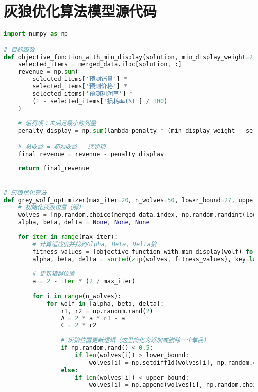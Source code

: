 \documentclass[withoutpreface,bwprint]{cumcmthesis} %
\begin{document}
\section{灰狼优化算法模型源代码}
\begin{lstlisting}[language=python]
import numpy as np

# 目标函数
def objective_function_with_min_display(solution, min_display_weight=2.5, lambda_penalty=300):
    selected_items = merged_data.iloc[solution, :]
    revenue = np.sum(
        selected_items['预测销量'] * 
        selected_items['预测价格'] * 
        selected_items['预测利润率'] * 
        (1 - selected_items['损耗率(%)'] / 100)
    )
    
    # 惩罚项：未满足最小陈列量
    penalty_display = np.sum(lambda_penalty * (min_display_weight - selected_items['预测销量'])**2 * (selected_items['预测销量'] < min_display_weight))

    # 总收益 = 初始收益 - 惩罚项
    final_revenue = revenue - penalty_display
    
    return final_revenue


# 灰狼优化算法
def grey_wolf_optimizer(max_iter=20, n_wolves=50, lower_bound=27, upper_bound=33):
    # 初始化灰狼位置（解）
    wolves = [np.random.choice(merged_data.index, np.random.randint(lower_bound, upper_bound), replace=False) for _ in range(n_wolves)]
    alpha, beta, delta = None, None, None
    
    for iter in range(max_iter):
        # 计算适应度并找到Alpha, Beta, Delta狼
        fitness_values = [objective_function_with_min_display(wolf) for wolf in wolves]
        alpha, beta, delta = sorted(zip(wolves, fitness_values), key=lambda x: x[1], reverse=True)[:3]
        
        # 更新狼群位置
        a = 2 - iter * (2 / max_iter)
        
        for i in range(n_wolves):
            for wolf in [alpha, beta, delta]:
                r1, r2 = np.random.rand(2)
                A = 2 * a * r1 - a
                C = 2 * r2
                
                # 灰狼位置更新逻辑（这里简化为添加或删除一个单品）
                if np.random.rand() < 0.5:
                    if len(wolves[i]) > lower_bound:
                        wolves[i] = np.setdiff1d(wolves[i], np.random.choice(wolves[i]))  # 删除一个单品
                else:
                    if len(wolves[i]) < upper_bound:
                        wolves[i] = np.append(wolves[i], np.random.choice(np.setdiff1d(merged_data.index, wolves[i])))  # 添加一个单品
        

\end{lstlisting}
\end{document}
